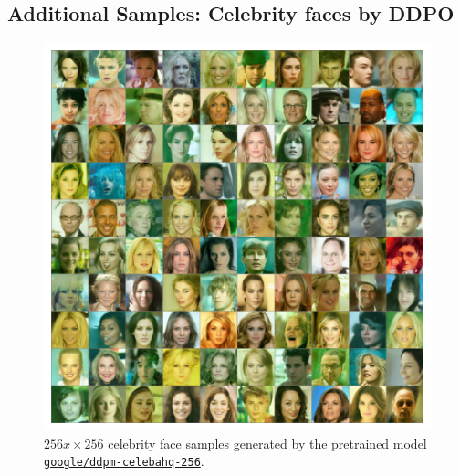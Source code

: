 \begin{appendixs}
    \newpage

	
	\section{Additional Samples: Celebrity faces by DDPO}\label{appendix:additional-celebahq-samples}


        \begin{figure}
            \centering
            \includegraphics[scale=0.8]{img/results/ddpm-samples.png}
            \vspace{-4pt}  %
            \captionsetup{width=\textwidth} %
            \caption{$256x\times256$ celebrity face samples generated by the pretrained model \href{https://huggingface.co/google/ddpm-celebahq-256}{\texttt{\texttt{google/ddpm-celebahq-256}}}.}
            \label{fig:ddpm-samples}
        \end{figure}


\end{appendixs}
